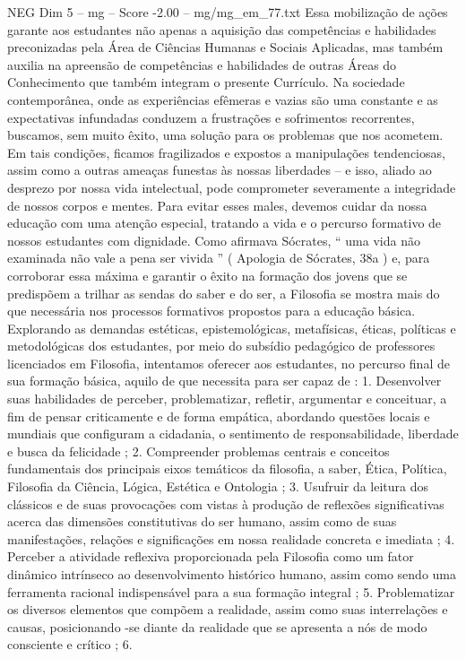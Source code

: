 \begin{textsample}{NEG Dim 5 – mg – Score -2.00 – mg/mg\_em\_77.txt}
Essa mobilização de ações garante aos estudantes não apenas a aquisição das competências e habilidades preconizadas pela Área de Ciências Humanas e Sociais Aplicadas, mas também auxilia na apreensão de competências e habilidades de outras Áreas do Conhecimento que também integram o presente Currículo.
Na sociedade contemporânea, onde as experiências efêmeras e vazias são uma constante e as expectativas infundadas conduzem a frustrações e sofrimentos recorrentes, buscamos, sem muito êxito, uma solução para os problemas que nos acometem.
Em tais condições, ficamos fragilizados e expostos a manipulações tendenciosas, assim como a outras ameaças funestas às nossas liberdades – e isso, aliado ao desprezo por nossa vida intelectual, pode comprometer severamente a integridade de nossos corpos e mentes.
Para evitar esses males, devemos cuidar da nossa educação com uma atenção especial, tratando a vida e o percurso formativo de nossos estudantes com dignidade.
Como afirmava Sócrates, “ uma vida não examinada não vale a pena ser vivida ” ( Apologia de Sócrates, 38a ) e, para corroborar essa máxima e garantir o êxito na formação dos jovens que se predispõem a trilhar as sendas do saber e do ser, a Filosofia se mostra mais do que necessária nos processos formativos propostos para a educação básica.
Explorando as demandas estéticas, epistemológicas, metafísicas, éticas, políticas e metodológicas dos estudantes, por meio do subsídio pedagógico de professores licenciados em Filosofia, intentamos oferecer aos estudantes, no percurso final de sua formação básica, aquilo de que necessita para ser capaz de : 1.
Desenvolver suas habilidades de perceber, problematizar, refletir, argumentar e conceituar, a fim de pensar criticamente e de forma empática, abordando questões locais e mundiais que configuram a cidadania, o sentimento de responsabilidade, liberdade e busca da felicidade ; 2.
Compreender problemas centrais e conceitos fundamentais dos principais eixos temáticos da filosofia, a saber, Ética, Política, Filosofia da Ciência, Lógica, Estética e Ontologia ; 3.
Usufruir da leitura dos clássicos e de suas provocações com vistas à produção de reflexões significativas acerca das dimensões constitutivas do ser humano, assim como de suas manifestações, relações e significações em nossa realidade concreta e imediata ; 4.
Perceber a atividade reflexiva proporcionada pela Filosofia como um fator dinâmico intrínseco ao desenvolvimento histórico humano, assim como sendo uma ferramenta racional indispensável para a sua formação integral ; 5.
Problematizar os diversos elementos que compõem a realidade, assim como suas interrelações e causas, posicionando -se diante da realidade que se apresenta a nós de modo consciente e crítico ; 6.

\end{textsample}
